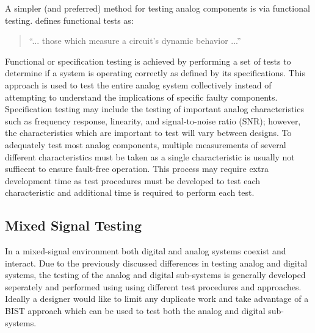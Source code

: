 \documentclass[12pt]{report}
\begin{document}
A simpler (and preferred\cite{syschip}) method for testing analog components is via functional testing. \cite{milor} defines functional tests as: 
\begin{quote}
``... those which measure a circuit's dynamic behavior ...\cite{milor}''
\end{quote}
Functional or specification testing is achieved by performing a set of tests to determine if a system is operating correctly as defined by its specifications.  This approach is used to test the entire analog system collectively instead of attempting to understand the implications of specific faulty components\cite{analogmixedtest}.  Specification testing may include the testing of important analog characteristics such as frequency response, linearity, and signal-to-noise ratio (SNR)\cite{syschip}; however, the characteristics which are important  to test will vary between designs.  To adequately test most analog components, multiple measurements of several different characteristics must be taken as a single characteristic is usually not sufficent to ensure fault-free operation\cite{analogmixedtest}.  This process may require extra development time as test procedures must be developed to test each characteristic and additional time is required to perform each test\cite{analogmixedtest}.

\subsection{Mixed Signal Testing}
\label{sct:MixedSignal}
In a mixed-signal environment both digital and analog systems coexist and interact.  Due to the previously discussed differences in testing analog and digital systems, the testing of the analog and digital sub-systems is generally developed seperately and performed using using different test procedures and approaches\cite{analogmixedtest}.  Ideally a designer would like to limit any duplicate work and take advantage of a BIST approach which can be used to test both the analog and digital sub-systems.
\end{document}
